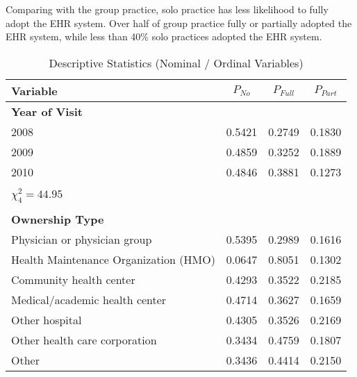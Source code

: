 \documentclass[12pt]{report}
\begin{document}
Comparing with the group practice, solo practice has less likelihood to fully adopt the EHR system. Over half of group practice fully or partially adopted the EHR system, while less than 40\% solo practices adopted the EHR system. 
{\footnotesize 
\begin{center}

\label{tab:desc1}

\begin{longtable}{lccc}
\caption{Descriptive Statistics (Nominal / Ordinal Variables)}\\


\hline \hline Variable & $P_{No}$ & $P_{Full}$ & $P_{Part}$ \\ \hline \endhead

\hline \endfoot
\hline \hline \endlastfoot
\textbf{Year of Visit}                 &          &            &            \\
2008                                   & 0.5421   & 0.2749     & 0.1830     \\
2009                                   & 0.4859   & 0.3252     & 0.1889     \\
2010                                   & 0.4846   & 0.3881     & 0.1273     \\
                                       &          &            &            \\
$\chi^2_4 = 44.95$                     &          &            &            \\
                                       &          &            &            \\
\textbf{Ownership Type}                &          &            &            \\
Physician or physician group           & 0.5395   & 0.2989     & 0.1616     \\
Health Maintenance Organization (HMO)  & 0.0647   & 0.8051     & 0.1302     \\
Community health center                & 0.4293   & 0.3522     & 0.2185     \\
Medical/academic health center         & 0.4714   & 0.3627     & 0.1659     \\
Other hospital                         & 0.4305   & 0.3526     & 0.2169     \\
Other health care corporation          & 0.3434   & 0.4759     & 0.1807     \\
Other                                  & 0.3436   & 0.4414     & 0.2150     \\

\end{longtable}
\end{center}}
\end{document}
